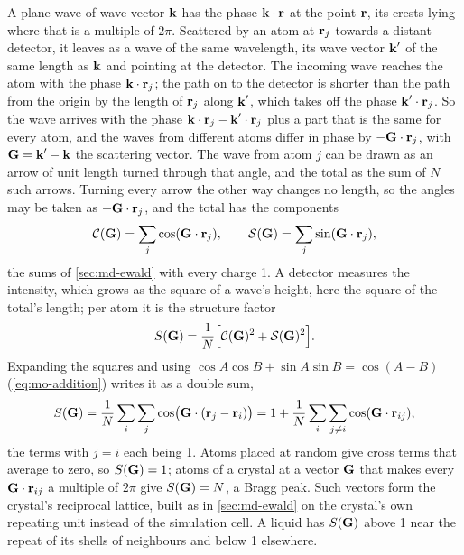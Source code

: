 A plane wave of wave vector $\bm{\mathrm{k}}$ has the phase $\bm{\mathrm{k}}\cdot\bm{\mathrm{r}}$ at
the point $\bm{\mathrm{r}}$, its crests lying where that is a multiple of $2\pi$.
Scattered by an atom at $\bm{\mathrm{r}}_j$ towards a distant detector, it leaves
as a wave of the same wavelength, its wave vector $\bm{\mathrm{k}}'$ of the same
length as $\bm{\mathrm{k}}$ and pointing at the detector. The incoming wave
reaches the atom with the phase $\bm{\mathrm{k}}\cdot\bm{\mathrm{r}}_j$; the path on to the
detector is shorter than the path from the origin by the length of
$\bm{\mathrm{r}}_j$ along $\bm{\mathrm{k}}'$, which takes off the phase
$\bm{\mathrm{k}}'\cdot\bm{\mathrm{r}}_j$. So the wave arrives with the phase
$\bm{\mathrm{k}}\cdot\bm{\mathrm{r}}_j - \bm{\mathrm{k}}'\cdot\bm{\mathrm{r}}_j$ plus a part that is the same
for every atom, and the waves from different atoms differ in phase by
$-\bm{\mathrm{G}}\cdot\bm{\mathrm{r}}_j$, with $\bm{\mathrm{G}} = \bm{\mathrm{k}}' - \bm{\mathrm{k}}$ the scattering
vector. The wave from atom $j$ can be drawn as an arrow of unit length
turned through that angle, and the total as the sum of $N$ such arrows.
Turning every arrow the other way changes no length, so the angles may
be taken as $+\bm{\mathrm{G}}\cdot\bm{\mathrm{r}}_j$, and the total has the components
\begin{equation*}
   \mathcal{C}(\bm{\mathrm{G}}) = \sum_j\cos(\bm{\mathrm{G}}\cdot\bm{\mathrm{r}}_j) , \qquad
   \mathcal{S}(\bm{\mathrm{G}}) = \sum_j\sin(\bm{\mathrm{G}}\cdot\bm{\mathrm{r}}_j) ,
\end{equation*}
the sums of \cref{sec:md-ewald} with every charge 1. A detector
measures the intensity, which grows as the square of a wave's height,
here the square of the total's length; per atom it is the structure
factor
\begin{equation}
   S(\bm{\mathrm{G}}) = \frac1N\Bigl[\mathcal{C}(\bm{\mathrm{G}})^2 + \mathcal{S}(\bm{\mathrm{G}})^2
   \Bigr] .
   \label{eq:ob-sq}
\end{equation}
Expanding the squares and using $\cos A\cos B + \sin A\sin B = \cos(A -
B)$ (\cref{eq:mo-addition}) writes it as a double sum,
\begin{equation*}
   S(\bm{\mathrm{G}}) = \frac1N\sum_i\sum_j\cos\bigl(\bm{\mathrm{G}}\cdot(\bm{\mathrm{r}}_j -
   \bm{\mathrm{r}}_i)\bigr) = 1 + \frac1N\sum_i\sum_{j\neq i}\cos(\bm{\mathrm{G}}\cdot
   \bm{\mathrm{r}}_{ij}) ,
\end{equation*}
the terms with $j = i$ each being 1. Atoms placed at random give cross
terms that average to zero, so $S(\bm{\mathrm{G}}) = 1$; atoms of a crystal at a
vector $\bm{\mathrm{G}}$ that makes every $\bm{\mathrm{G}}\cdot\bm{\mathrm{r}}_{ij}$ a multiple of
$2\pi$ give $S(\bm{\mathrm{G}}) = N$, a Bragg peak. Such vectors form the
crystal's reciprocal lattice, built as in \cref{sec:md-ewald} on the
crystal's own repeating unit instead of the simulation cell. A liquid has
$S(\bm{\mathrm{G}})$ above 1 near the repeat of its shells of neighbours and below
1 elsewhere.

